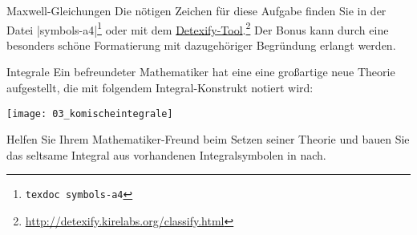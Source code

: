 \documentclass[
	vorläufig=false, 
	blattnr=3,
	ausgabe=2022-10-26,
	abgabe=2022-11-09,
	lösung=true,
	shortverb,
]{../tex/latexkurs-exercise}
\begin{document}
\begin{aufgabe}[3 (+1 Bonus)]{Maxwell-Gleichungen}
   Die nötigen Zeichen für diese Aufgabe finden Sie in der Datei |symbols-a4|\footnote{\texttt{texdoc symbols-a4}} oder mit dem \href{http://detexify.kirelabs.org/classify.html}{Detexify-Tool}.\footnote{\url{http://detexify.kirelabs.org/classify.html}} Der Bonus kann durch eine besonders schöne Formatierung mit dazugehöriger Begründung erlangt werden.
                                                                                                                                                                                                                                                                                                                               
\end{aufgabe}


\begin{aufgabe}[3]{Integrale}
   Ein befreundeter Mathematiker hat eine eine großartige neue Theorie aufgestellt, die mit folgendem Integral-Konstrukt notiert wird:                                                                                                                                                                                    
   \begin{center}                                                                                                                                                                                                                                                                                                         
        \texttt{[image: 03\_komischeintegrale]} %
   \end{center}                                                                                                                                                                                                                                                                                                           
   Helfen Sie Ihrem Mathematiker-Freund beim Setzen seiner Theorie und bauen Sie das seltsame Integral aus vorhandenen Integralsymbolen in  nach.                                                                                                                                                        
   
\end{aufgabe}
\end{document}
